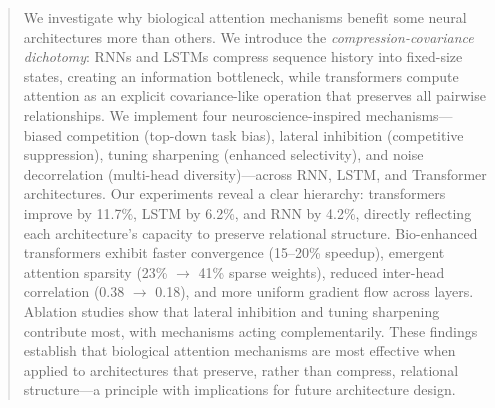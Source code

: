 \begin{abstract}
We investigate why biological attention mechanisms benefit some neural architectures more than others. We introduce the \textit{compression-covariance dichotomy}: RNNs and LSTMs compress sequence history into fixed-size states, creating an information bottleneck, while transformers compute attention as an explicit covariance-like operation that preserves all pairwise relationships. We implement four neuroscience-inspired mechanisms---biased competition (top-down task bias), lateral inhibition (competitive suppression), tuning sharpening (enhanced selectivity), and noise decorrelation (multi-head diversity)---across RNN, LSTM, and Transformer architectures. Our experiments reveal a clear hierarchy: transformers improve by 11.7\%, LSTM by 6.2\%, and RNN by 4.2\%, directly reflecting each architecture's capacity to preserve relational structure. Bio-enhanced transformers exhibit faster convergence (15--20\% speedup), emergent attention sparsity (23\% $\rightarrow$ 41\% sparse weights), reduced inter-head correlation (0.38 $\rightarrow$ 0.18), and more uniform gradient flow across layers. Ablation studies show that lateral inhibition and tuning sharpening contribute most, with mechanisms acting complementarily. These findings establish that biological attention mechanisms are most effective when applied to architectures that preserve, rather than compress, relational structure---a principle with implications for future architecture design.
\end{abstract}
